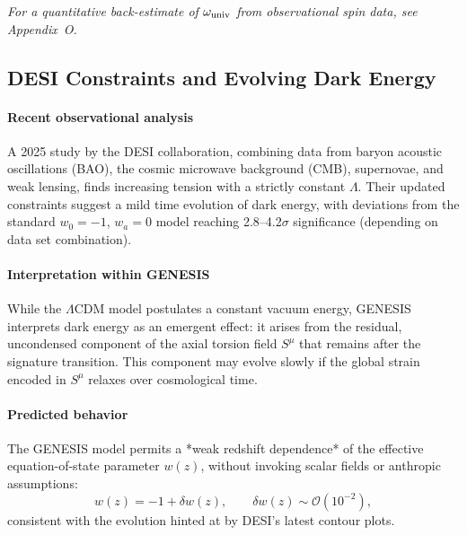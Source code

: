 \documentclass{article}
\begin{document}
\medskip
\begin{center}
\end{center}
\medskip

\vspace{0.5em}
\noindent
\textit{For a quantitative back-estimate of $\omega_{\rm univ}$ from observational spin data, see Appendix~O.}


\subsection{DESI Constraints and Evolving Dark Energy}
\label{sec:DESI-DE}

\paragraph{Recent observational analysis}
A 2025 study by the DESI collaboration, combining data from baryon acoustic oscillations (BAO), the cosmic microwave background (CMB), supernovae, and weak lensing, finds increasing tension with a strictly constant $\Lambda$. Their updated constraints suggest a mild time evolution of dark energy, with deviations from the standard $w_0 = -1$, $w_a = 0$ model reaching 2.8–4.2$\sigma$ significance (depending on data set combination).

\paragraph{Interpretation within GENESIS}
While the $\Lambda$CDM model postulates a constant vacuum energy, GENESIS interprets dark energy as an emergent effect: it arises from the residual, uncondensed component of the axial torsion field $S^\mu$ that remains after the signature transition. This component may evolve slowly if the global strain encoded in $S^\mu$ relaxes over cosmological time.

\paragraph{Predicted behavior}
The GENESIS model permits a *weak redshift dependence* of the effective equation-of-state parameter $w(z)$, without invoking scalar fields or anthropic assumptions:
\[
  w(z) = -1 + \delta w(z),
  \qquad
  \delta w(z) \sim \mathcal{O}(10^{-2}),
\]
consistent with the evolution hinted at by DESI's latest contour plots.
\end{document}
